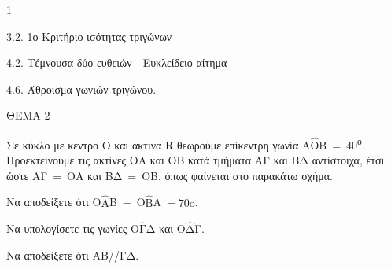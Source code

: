 \begin{ylh}{1}
    \item 3.2. 1ο Κριτήριο ισότητας τριγώνων
    \item 4.2. Τέμνουσα δύο ευθειών - Ευκλείδειο αίτημα
    \item 4.6. Άθροισμα γωνιών τριγώνου.
\end{ylh}

ΘΕΜΑ 2

Σε κύκλο με κέντρο Ο και ακτίνα R θεωρούμε επίκεντρη γωνία Α$\widehat{\text{Ο}}$Β$\  = \ $40\textsuperscript{ο}. Προεκτείνουμε τις ακτίνες ΟΑ και ΟΒ κατά τμήματα ΑΓ και ΒΔ αντίστοιχα, έτσι ώστε ΑΓ$\  = \ $ΟΑ και ΒΔ$\  = \ $ΟΒ, όπως φαίνεται στο παρακάτω σχήμα.

\begin{alist}
\item Να αποδείξετε ότι Ο$\widehat{\text{Α}}$Β$\  = \ $Ο$\widehat{\text{Β}}$Α$\  = 7\text{0}\text{ο}$.


\item Να υπολογίσετε τις γωνίες $\text{O}\widehat{\text{Γ}}$Δ και $\text{O}\widehat{\text{Δ}}$Γ.


\item Να αποδείξετε ότι ΑΒ//ΓΔ.



\end{alist}

